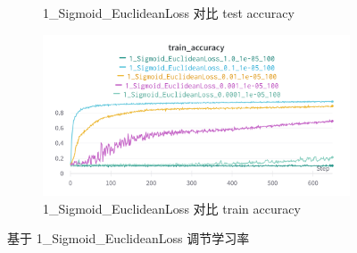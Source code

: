\documentclass{article}
\begin{document}
\begin{figure}
\begin{subfigure}{0.475\textwidth}
		\caption{1\_Sigmoid\_EuclideanLoss 对比 test accuracy}
	\end{subfigure}
	\begin{subfigure}{0.475\textwidth}
		\centering
		\includegraphics[width=1\textwidth]{../pics/学习率_1_Sigmoid_EuclideanLoss_train_acc.png}
		\caption{1\_Sigmoid\_EuclideanLoss 对比 train accuracy}
	\end{subfigure}
	\caption{基于 1\_Sigmoid\_EuclideanLoss 调节学习率}
	\label{fig:7}
\end{figure}
\end{document}

